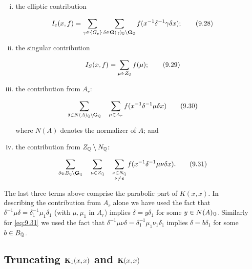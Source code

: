 \begin{enumerate}[(i)]

\item the elliptic contribution

\begin{equation}\label{eq:9.28}
I_e(x, f) = \sum_{\gamma \in \{G_e\}}\sum_{\delta \in \mathbf{G}(\gamma)_{\mathbb{Q}} \backslash \mathbf{G}_{\mathbb{Q}}} f(x^{-1}\delta^{-1}\gamma\delta x);\tag{9.28}
\end{equation}

\item the singular contribution

\begin{equation}\label{eq:9.29}
I_S(x, f) = \sum_{\mu \in Z_{\mathbb{Q}}} f(\mu);\tag{9.29}
\end{equation}

\item the contribution from $A_r$:

\begin{equation}\label{eq:9.30}
\sum_{\delta \in N(A)_{\mathbb{Q}} \backslash \mathbf{G}_{\mathbb{Q}}}\quad \sum_{\mu \in A_r} f(x^{-1}\delta^{-1}\mu\delta x)\tag{9.30}
\end{equation}

where $N(A)$ denotes the normalizer of $A$; and

\item the contribution from $Z_{\mathbb{Q}} \setminus N_{\mathbb{Q}}$:

\begin{equation}\label{eq:9.31}
\sum_{\delta \in B_{\mathbb{Q}} \backslash \mathbf{G}_{\mathbb{Q}}}\quad \sum_{\mu \in Z_{\mathbb{Q}}}\quad \sum_{\substack{\nu \in N_{\mathbb{Q}}\\ \nu \neq e}} f(x^{-1}\delta^{-1}\mu\nu\delta x).\tag{9.31}
\end{equation}

\end{enumerate}

The last three terms above comprise the parabolic part of $K(x,x)$. In describing the contribution from $A_r$ alone we have used the fact that $\delta^{-1}\mu\delta = \delta_1^{-1}\mu_1\delta_1$ (with $\mu, \mu_1$ in $A_r$) implies $\delta = y\delta_1$ for some $y \in N(A)_{\mathbb{Q}}$. Similarly for \eqref{eq:9.31} we used the fact that $\delta^{-1}\mu\nu\delta = \delta_1^{-1}\mu_1\nu_1\delta_1$ implies $\delta = b\delta_1$ for some $b \in B_{\mathbb{Q}}$.

\subsection{Truncating \texorpdfstring{$\mathbf{K}_1(x,x)$}{K1(x,x)} and \texorpdfstring{$\mathbf{K}(x,x)$}{K(x,x)}}

